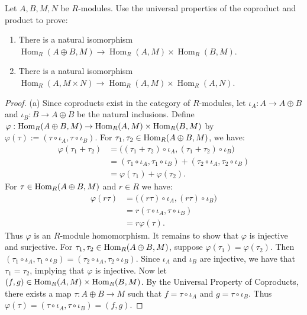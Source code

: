 \documentclass[10pt,oneside,openany]{memoir}
\begin{document}
\begin{exercise}
Let $A,B,M,N$ be $R$-modules. Use the universal properties of the coproduct
and product to prove:
\begin{enumerate}
\item[(a)] There is a natural isomorphism
$\operatorname{Hom}_R(A\oplus B,M)\longrightarrow
\operatorname{Hom}_R(A,M)\times\operatorname{Hom}_R(B,M)$.

\item[(b)] There is a natural isomorphism
$\operatorname{Hom}_R(A,M\times N)\longrightarrow
\operatorname{Hom}_R(A,M)\times\operatorname{Hom}_R(A,N)$.
\end{enumerate}
\end{exercise}
	{\color{blue} \begin{proof}
		(a) Since coproducts exist in the category of $R$-modules, let $\iota_A:A \rightarrow A \oplus B$ and $\iota_B : B \rightarrow A \oplus B$ be the natural inclusions. Define $\varphi:\operatorname{Hom}_R(A \oplus B,M) \rightarrow \operatorname{Hom}_R(A,M) \times \operatorname{Hom}_R(B,M)$ by $\varphi(\tau) := (\tau \circ \iota_A, \tau \circ \iota_B)$. For $\tau_1,\tau_2 \in \operatorname{Hom}_R(A\oplus B,M)$, we have:
		\begin{align*}
			\varphi(\tau_1 + \tau_2)
			&= \bigl( (\tau_1 + \tau_2)\circ \iota_A, (\tau_1 + \tau_2)\circ \iota_B \bigr) \\
			&= (\tau_1 \circ \iota_A, \tau_1 \circ \iota_B) + (\tau_2 \circ \iota_A, \tau_2 \circ \iota_B) \\
			&= \varphi(\tau_1) + \varphi(\tau_2).
		\end{align*}
		For $\tau \in \operatorname{Hom}_R(A\oplus B,M)$ and $r \in R$ we have:
		\begin{align*}
			\varphi(r\tau)
			&= \bigl( (r\tau)\circ \iota_A, (r\tau) \circ \iota_B \bigr) \\
			&= r(\tau \circ \iota_A, \tau \circ \iota_B) \\
			&= r\varphi(\tau).
		\end{align*}
		Thus $\varphi$ is an $R$-module homomorphism. It remains to show that $\varphi$ is injective and surjective. For $\tau_1,\tau_2 \in \operatorname{Hom}_R(A \oplus B,M)$, suppose $\varphi(\tau_1) = \varphi(\tau_2)$. Then $(\tau_1 \circ \iota_A, \tau_1 \circ \iota_B) = (\tau_2 \circ \iota_A, \tau_2 \circ \iota_B)$. Since $\iota_A$ and $\iota_B$ are injective, we have that $\tau_1 = \tau_2$, implying that $\varphi$ is injective. Now let $(f,g) \in \operatorname{Hom}_R(A,M) \times \operatorname{Hom}_R(B,M)$. By the Universal Property of Coproducts, there exists a map $\tau:A \oplus B \rightarrow M$ such that $f = \tau \circ \iota_A$ and $g = \tau \circ \iota_B$. Thus $\varphi(\tau) = (\tau \circ \iota_A, \tau \circ \iota_B) = (f,g)$.


\end{proof}}
\end{document}
